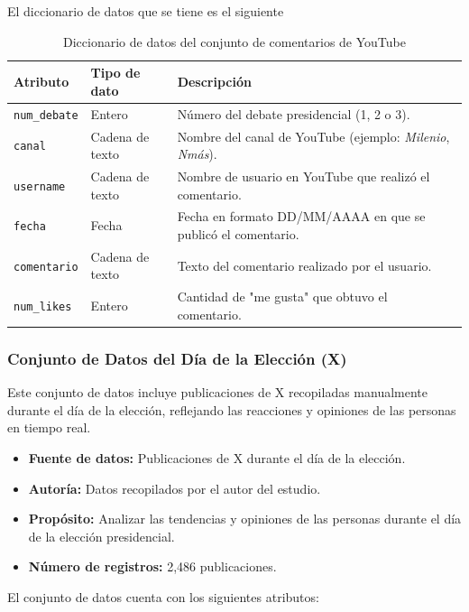 \documentclass[10pt, a4paper]{article}
\begin{document}
	El diccionario de datos que se tiene es el siguiente
	
	\begin{table}[h]
		\centering
		\begin{tabular}{llp{9cm}}
			\hline
			\textbf{Atributo} & \textbf{Tipo de dato} & \textbf{Descripción} \\
			\hline
			\texttt{num\_debate} & Entero & Número del debate presidencial (1, 2 o 3). \\
			\texttt{canal} & Cadena de texto & Nombre del canal de YouTube (ejemplo: \textit{Milenio}, \textit{Nmás}). \\
			\texttt{username} & Cadena de texto & Nombre de usuario en YouTube que realizó el comentario. \\
			\texttt{fecha} & Fecha & Fecha en formato DD/MM/AAAA en que se publicó el comentario. \\
			\texttt{comentario} & Cadena de texto & Texto del comentario realizado por el usuario. \\
			\texttt{num\_likes} & Entero & Cantidad de "me gusta" que obtuvo el comentario. \\
			\hline
		\end{tabular}
		\caption{Diccionario de datos del conjunto de comentarios de YouTube}
	\end{table}
	
	\subsubsection{Conjunto de Datos del Día de la Elección (X)}
	
	Este conjunto de datos incluye publicaciones de X recopiladas manualmente durante el día de la elección, reflejando las reacciones y opiniones de las personas en tiempo real.
	
	\begin{itemize}
		\item \textbf{Fuente de datos:} Publicaciones de X durante el día de la elección.
		\item \textbf{Autoría:} Datos recopilados por el autor del estudio.
		\item \textbf{Propósito:} Analizar las tendencias y opiniones de las personas durante el día de la elección presidencial.
		\item \textbf{Número de registros:} 2,486 publicaciones.
	\end{itemize}
	
	El conjunto de datos cuenta con los siguientes atributos:
	
\end{document}
